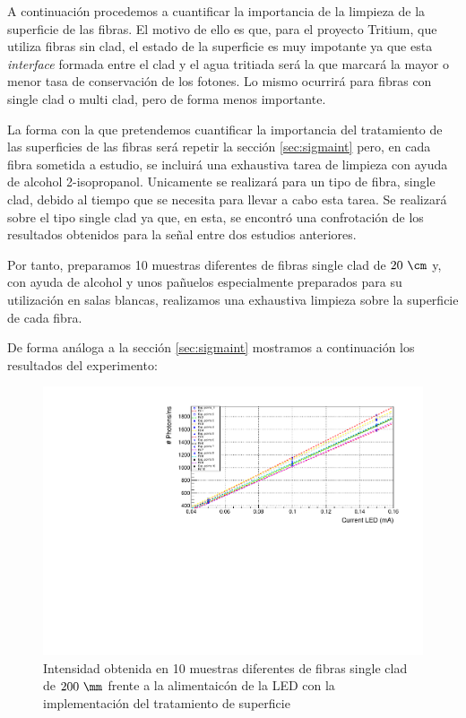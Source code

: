 A continuación procedemos a cuantificar la importancia de la limpieza de la superficie de las fibras. El motivo de ello es que, para el proyecto Tritium, que utiliza fibras sin clad, el estado de la superficie es muy impotante ya que esta \textit{interface} formada entre el clad y el agua tritiada será la que marcará la mayor o menor tasa de conservación de los fotones. Lo mismo ocurrirá para fibras con single clad o multi clad, pero de forma menos importante.

La forma con la que pretendemos cuantificar la importancia del tratamiento de las superficies de las fibras será repetir la sección \ref{sec:sigmaint} pero, en cada fibra sometida a estudio, se incluirá una exhaustiva tarea de limpieza con ayuda de alcohol 2-isopropanol. Unicamente se realizará para un tipo de fibra, single clad, debido al tiempo que se necesita para llevar a cabo esta tarea. Se realizará sobre el tipo single clad ya que, en esta, se encontró una confrotación de los resultados obtenidos para la señal entre dos estudios anteriores.

Por tanto, preparamos 10 muestras diferentes de fibras single clad de $20~\cm$ y, con ayuda de alcohol y unos pañuelos especialmente preparados para su utilización en salas blancas, realizamos una exhaustiva limpieza sobre la superficie de cada fibra.

De forma análoga a la sección \ref{sec:sigmaint} mostramos a continuación los resultados del experimento:

\begin{figure}[hbtp]
\centering
\includegraphics[scale=0.7]{Figuras/SamplesSingleCladMarcos.pdf}
\caption{Intensidad obtenida en 10 muestras diferentes de fibras single clad de $200~\mm$ frente a la alimentaicón de la LED con la implementación del tratamiento de superficie\label{medidassinglecladlimpieza}}
\end{figure}

